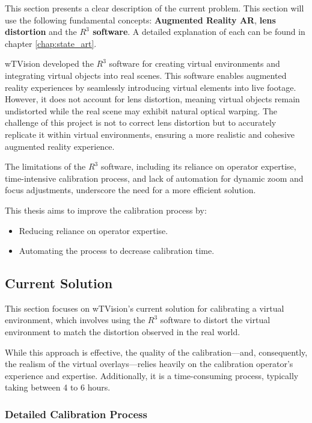 \noindent This section presents a clear description of the current problem. This section will use the following fundamental concepts: \textbf{Augmented Reality \ac{AR}}, \textbf{lens distortion} and the \textbf{$R^3$ software}. A detailed explanation of each can be found in chapter \ref{chap:state_art}.

\noindent wTVision developed the \( R^3 \) software for creating virtual environments and integrating virtual objects into real scenes. This software enables augmented reality experiences by seamlessly introducing virtual elements into live footage. However, it does not account for lens distortion, meaning virtual objects remain undistorted while the real scene may exhibit natural optical warping. The challenge of this project is not to correct lens distortion but to accurately replicate it within virtual environments, ensuring a more realistic and cohesive augmented reality experience.

\noindent The limitations of the $R^3$ software, including its reliance on operator expertise, time-intensive calibration process, and lack of automation for dynamic zoom and focus adjustments, underscore the need for a more efficient solution.

\noindent This thesis aims to improve the calibration process by:
\begin{itemize}
    \item Reducing reliance on operator expertise.
    \item Automating the process to decrease calibration time.
\end{itemize}

\subsection{Current Solution} \label{sec:current_solution}

\noindent This section focuses on wTVision’s current solution for calibrating a virtual environment, which
involves using the $R^3$
software to distort the virtual environment to match the distortion observed
in the real world.

\noindent While this approach is effective, the quality of the calibration—and, consequently, the realism of the virtual overlays—relies heavily on the calibration operator’s experience and expertise. Additionally, it is a time-consuming process, typically taking between 4 to 6 hours.

\subsubsection*{Detailed Calibration Process}

